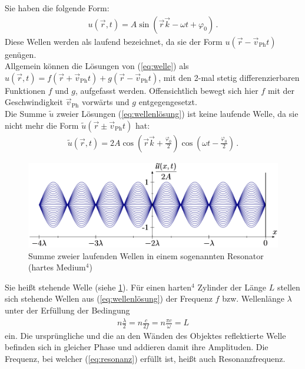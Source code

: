 \documentclass[numbers=noenddot,12pt,a4paper]{scrartcl}
\newcommand{\ix}[1]{_\text{#1}}
\begin{document}
\newpage
\fancyfoot[L]{}

Sie haben die folgende Form:
\begin{align}
	u(\vec{r},t)=A\sin\left(\vec{r}\vec{k}-\omega t+\varphi_0\right) \, .\label{eq:wellenlösung}
\end{align}
Diese Wellen werden als laufend bezeichnet, da sie der Form $u\left(\vec{r}-\vec{v}\ix{Ph}t\right)$ genügen.\\
Allgemein können die Lösungen von (\ref{eq:welle}) als  $u\left(\vec{r},t\right)=f\left(\vec{r}+\vec{v}\ix{Ph}t\right)+g\left(\vec{r}-\vec{v}\ix{Ph}t\right)$, mit den 2-mal stetig differenzierbaren Funktionen $f$ und $g$, aufgefasst werden. Offensichtlich bewegt sich hier $f$ mit der Geschwindigkeit $\vec{v}\ix{Ph}$ vorwärts und $g$ entgegengesetzt.\\
Die Summe $\tilde{u}$ zweier Lösungen (\ref{eq:wellenlösung}) ist keine laufende Welle, da sie nicht mehr die Form $\tilde{u}\left(\vec{r}\pm\vec{v}\ix{Ph}t\right)$ hat:
\begin{align}
	\tilde{u}\left(\vec{r},t\right)=2A\cos\left(\vec{r}\vec{k}+\frac{\varphi_0}{2}\right)\cos\left(\omega t-\frac{\varphi_0}{2}\right) \, . \label{eq:stehend}
\end{align}
\begin{figure}[H]
	\centering
	\includegraphics[width=\textwidth]{stehendewelle.png}
	\caption{Summe zweier laufenden Wellen in einem sogenannten Resonator (hartes Medium$^4$)} \label{img:stehendewelle}
\end{figure}
Sie heißt stehende Welle (siehe \ref{img:stehendewelle}). Für einen harten$^4$ Zylinder der Länge $L$ stellen sich stehende Wellen aus (\ref{eq:wellenlösung}) der Frequenz $f$ bzw. Wellenlänge $\lambda$ unter der Erfüllung der Bedingung
\begin{align}
n\frac{\lambda}{2}=n\frac{c}{2f}=n\frac{\pi c}{\omega}=L \label{eq:resonanz}
\end{align}
ein. Die ursprüngliche und die an den Wänden des Objektes reflektierte Welle befinden sich in gleicher Phase und addieren damit ihre Amplituden. Die Frequenz, bei welcher (\ref{eq:resonanz}) erfüllt ist, heißt auch Resonanzfrequenz.
\end{document}
